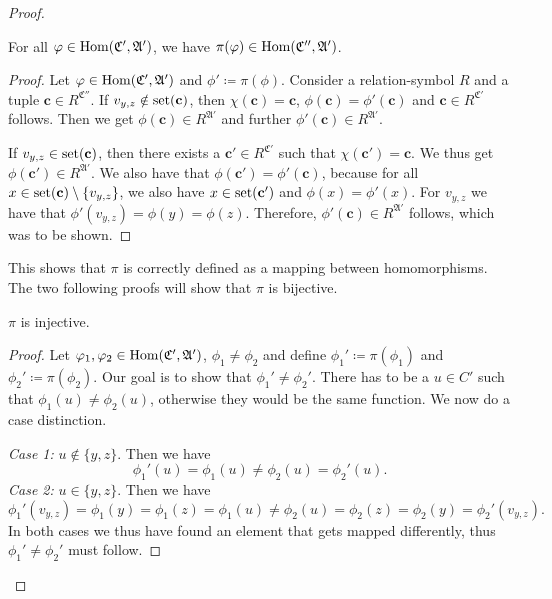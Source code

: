 \begin{proof}
	\begin{claim}
		For all $\varphi\in \operatorname{Hom}(\mathfrak C',\mathfrak A')$, we have $\pi(\varphi)\in\operatorname{Hom}(\mathfrak C'',\mathfrak A')$.
	\end{claim}
	\begin{proof}
		Let $\varphi\in\operatorname{Hom}(\mathfrak C',\mathfrak A')$ and $\phi'\coloneqq \pi(\phi)$.
		Consider a relation-symbol $R$ and a tuple $\mathbf c \in R^{\mathfrak C''}$.
		If $v_{y,z}\notin\operatorname{set}(\mathbf c)$, then $\chi(\mathbf c)=\mathbf c$, $\phi(\mathbf c)=\phi'(\mathbf c)$ and $\mathbf c\in R^{\mathfrak C'}$ follows.
		Then we get $\phi(\mathbf c)\in R^{\mathfrak A'}$ and further $\phi'(\mathbf c)\in R^{\mathfrak A'}$.
		
		If $v_{y,z}\in\operatorname{set}(\mathbf c)$, then there exists a $\mathbf c'\in R^{\mathfrak C'}$ such that $\chi(\mathbf c')=\mathbf c$. 
		We thus get $\phi(\mathbf c')\in R^{\mathfrak A'}$.
		We also have that $\phi(\mathbf c')=\phi'(\mathbf c)$, because for all $x \in \operatorname{set}(\mathbf c)\setminus \{v_{y,z}\}$, we also have $x\in\operatorname{set}(\mathbf c')$ and $\phi(x)=\phi'(x)$.
		For $v_{y,z}$ we have that $\phi'(v_{y,z})=\phi(y)=\phi(z)$.
		Therefore, $\phi'(\mathbf c)\in R^{\mathfrak A'}$ follows, which was to be shown.
	\end{proof}
	
	This shows that $\pi$ is correctly defined as a mapping between homomorphisms.
	The two following proofs will show that $\pi$ is bijective.
	
	\begin{claim}
		$\pi$ is injective.
	\end{claim}
	\begin{proof}
		Let $\varphi_1,\varphi_2\in\operatorname{Hom}(\mathfrak C',\mathfrak A')$, $\phi_1\neq\phi_2$ and define $\phi_1'\coloneqq \pi(\phi_1)$ and $\phi_2'\coloneqq \pi(\phi_2)$.
		Our goal is to show that $\phi_1'\neq \phi_2'$.
		There has to be a $u\in C'$ such that $\phi_1(u)\neq\phi_2(u)$, otherwise they would be the same function.
		We now do a case distinction.
		
		\emph{Case 1:} $u\notin\{y,z\}$. Then we have
		$$\phi_1'(u)=\phi_1(u)\neq \phi_2(u)=\phi_2'(u).$$
		\emph{Case 2:} $u\in \{y,z\}$. Then we have 
		$$\phi_1'(v_{y,z})=\phi_1(y)=\phi_1(z)=\phi_1(u)\neq \phi_2(u)=\phi_2(z)=\phi_2(y)=\phi_2'(v_{y,z}).$$
		In both cases we thus have found an element that gets mapped differently, thus $\phi_1'\neq\phi_2'$ must follow.
	\end{proof}
	

\end{proof}
